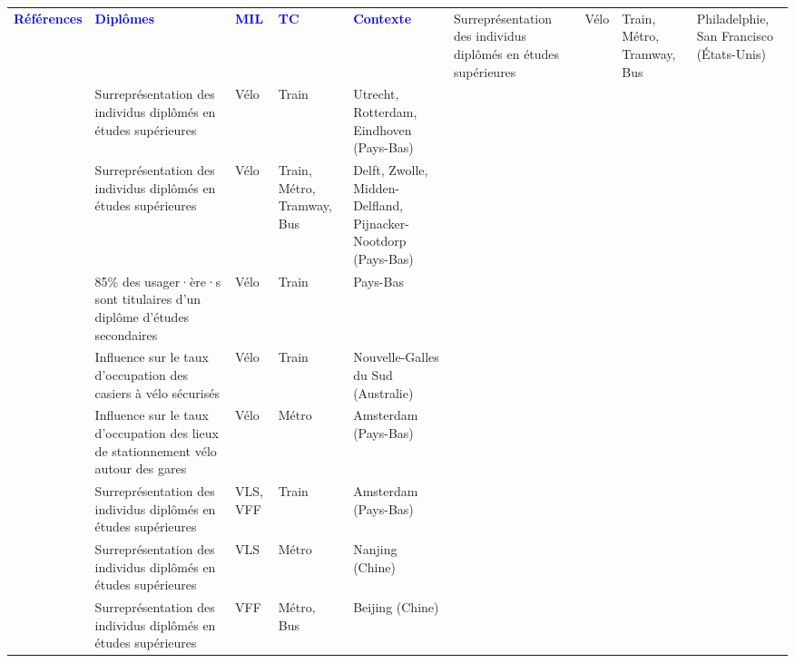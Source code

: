         \begin{longtable}{p{3cm}p{4cm}p{1.5cm}p{1.8cm}p{2.3cm}}
        \hline
        \textcolor{blue}{\textbf{Références}} & \textcolor{blue}{\textbf{Diplômes}} & \textcolor{blue}{\textbf{MIL}} & \textcolor{blue}{\textbf{TC}} & \textcolor{blue}{\textbf{Contexte}}
        \hline
        \endhead
    \small{\textcite{flamm_public_2014}} & \small{Surreprésentation des individus diplômés en études supérieures} & \small{Vélo} & \small{Train, Métro, Tramway, Bus} & \small{Philadelphie, San Francisco (États-Unis)}\\
    \small{\textcite{jonkeren_bicycle-train_2021}} & \small{Surreprésentation des individus diplômés en études supérieures} & \small{Vélo} & \small{Train} & \small{Utrecht, Rotterdam, Eindhoven (Pays-Bas)}\\
    \small{\textcite{heinen_multimodal_2014}} & \small{Surreprésentation des individus diplômés en études supérieures} & \small{Vélo} & \small{Train, Métro, Tramway, Bus} & \small{Delft, Zwolle, Midden-Delfland, Pijnacker-Nootdorp (Pays-Bas)}\\
    \small{\textcite{shelat_analysing_2018}} & \small{85\% des usager·ère·s sont titulaires d'un diplôme d'études secondaires} & \small{Vélo} & \small{Train} & \small{Pays-Bas}\\
    \small{\textcite{arbis_analysis_2016}} & \small{Influence sur le taux d'occupation des casiers à vélo sécurisés} & \small{Vélo} & \small{Train} & \small{Nouvelle-Galles du Sud (Australie)}\\
    \small{\textcite{kampen_bicycle_2021}} & \small{Influence sur le taux d'occupation des lieux de stationnement vélo autour des gares} & \small{Vélo} & \small{Métro} & \small{Amsterdam (Pays-Bas)}\\
    \small{\textcite{van_der_nat_bicycle_2018}} & \small{Surreprésentation des individus diplômés en études supérieures} & \small{VLS, VFF} & \small{Train} & \small{Amsterdam (Pays-Bas)}\\
    \small{\textcite{yang_empirical_2016}} & \small{Surreprésentation des individus diplômés en études supérieures} & \small{VLS} & \small{Métro} & \small{Nanjing (Chine)}\\
    \small{\textcite{guo_exploring_2023}} & \small{Surreprésentation des individus diplômés en études supérieures} & \small{VFF} & \small{Métro, Bus} & \small{Beijing (Chine)}\\

\end{longtable}
